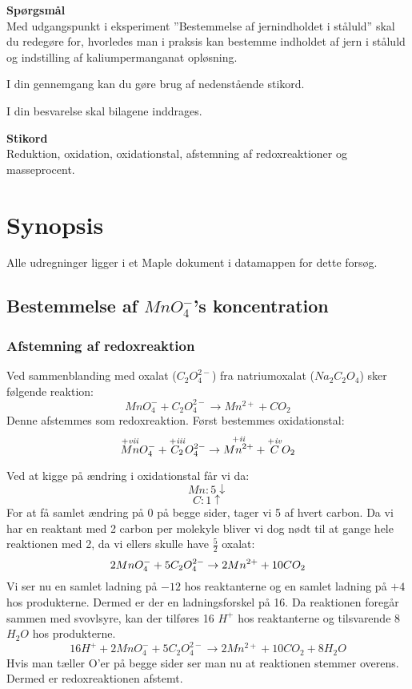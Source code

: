 \textbf{Spørgsmål}\\
Med udgangspunkt i eksperiment ”Bestemmelse af jernindholdet i ståluld” skal du redegøre for, hvorledes man i praksis kan bestemme indholdet af jern i ståluld og indstilling af kaliumpermanganat opløsning.

I din gennemgang kan du gøre brug af nedenstående stikord. 

I din besvarelse skal bilagene inddrages.

\vspace{0.5 cm}
\textbf{Stikord}\\
Reduktion, oxidation, oxidationstal, afstemning af redoxreaktioner og masseprocent.

\section*{Synopsis}
\newcommand{\RNum}[1]{\textit{\uppercase\expandafter{\romannumeral #1\relax}}}
Alle udregninger ligger i et Maple dokument i datamappen for dette forsøg.

\subsection{Bestemmelse af $MnO_4^-$'s koncentration}
\subsubsection{Afstemning af redoxreaktion}
Ved sammenblanding med oxalat ($C_2O_4^{2-}$) fra natriumoxalat ($Na_2C_2O_4$) sker følgende reaktion:
$$MnO_4^- + C_2 O_4 ^{2-} \rightarrow Mn^{2+} + CO_2$$
Denne afstemmes som redoxreaktion. 
Først bestemmes oxidationstal:
$$\overset{+\RNum{7}}{Mn}O_4^- + \overset{+\RNum{3}}{C_2} O_4 ^{2-} \rightarrow \overset{+\RNum{2}}{Mn^{2+}} + \overset{+\RNum{4}}{C}O_2$$

Ved at kigge på ændring i oxidationstal får vi da:
$$Mn: 5\downarrow$$
$$ C: 1\uparrow$$
For at få samlet ændring på $0$ på begge sider, tager vi 5 af hvert carbon. 
Da vi har en reaktant med 2 carbon per molekyle bliver vi dog nødt til at gange hele reaktionen med 2, da vi ellers skulle have $\frac{5}{2}$ oxalat:
$$2\space{} MnO_4^- + 5 C_2 O_4 ^{2-} \rightarrow 2 Mn^{2+} + 10 CO_2$$
Vi ser nu en samlet ladning på $-12$ hos reaktanterne og en samlet ladning på $+4$ hos produkterne. 
Dermed er der en ladningsforskel på 16. 
Da reaktionen foregår sammen med svovlsyre, kan der tilføres 16 $H^+$ hos reaktanterne og tilsvarende 8 $H_2 O$ hos produkterne. 
$$16 H^+ + 2 MnO_4^- + 5 C_2 O_4 ^{2-} \rightarrow 2 Mn^{2+} + 10 CO_2 + 8 H_2 O$$
Hvis man tæller O'er på begge sider ser man nu at reaktionen stemmer overens. 
Dermed er redoxreaktionen afstemt. 

